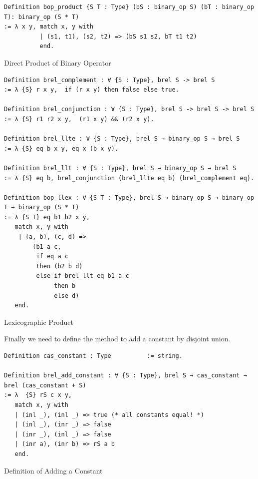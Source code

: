 \documentclass[a4paper,12pt,twoside,openright]{report}
\begin{document}
\begin{listing}[H]
\begin{verbatim}
Definition bop_product {S T : Type} (bS : binary_op S) (bT : binary_op T): binary_op (S * T) 
:= λ x y, match x, y with
          | (s1, t1), (s2, t2) => (bS s1 s2, bT t1 t2) 
          end.
\end{verbatim}
\caption{Direct Product of Binary Operator} 
\label{coq:def:direct_product}
\end{listing}

\begin{listing}[H]
\begin{verbatim}
Definition brel_complement : ∀ {S : Type}, brel S -> brel S 
:= λ {S} r x y,  if (r x y) then false else true. 
   
Definition brel_conjunction : ∀ {S : Type}, brel S -> brel S -> brel S 
:= λ {S} r1 r2 x y,  (r1 x y) && (r2 x y). 
   
Definition brel_llte : ∀ {S : Type}, brel S → binary_op S → brel S 
:= λ {S} eq b x y, eq x (b x y). 
   
Definition brel_llt : ∀ {S : Type}, brel S → binary_op S → brel S 
:= λ {S} eq b, brel_conjunction (brel_llte eq b) (brel_complement eq). 
 
Definition bop_llex : ∀ {S T : Type}, brel S → binary_op S → binary_op T → binary_op (S * T) 
:= λ {S T} eq b1 b2 x y,  
   match x, y with
    | (a, b), (c, d) => 
        (b1 a c, 
         if eq a c 
         then (b2 b d)
         else if brel_llt eq b1 a c 
              then b 
              else d)
   end.
\end{verbatim}
\caption{Lexicographic Product} 
\label{coq:def:lexicographic_product}
\end{listing}

Finally we need to define the method to add a constant by disjoint union.

\begin{listing}[H]
\begin{verbatim}
Definition cas_constant : Type          := string.   

Definition brel_add_constant : ∀ {S : Type}, brel S → cas_constant → brel (cas_constant + S)
:= λ  {S} rS c x y, 
   match x, y with
   | (inl _), (inl _) => true (* all constants equal! *) 
   | (inl _), (inr _) => false 
   | (inr _), (inl _) => false 
   | (inr a), (inr b) => rS a b 
   end.

\end{verbatim}
\caption{Definition of Adding a Constant} 
\label{coq:def:add_const}
\end{listing}
\end{document}
